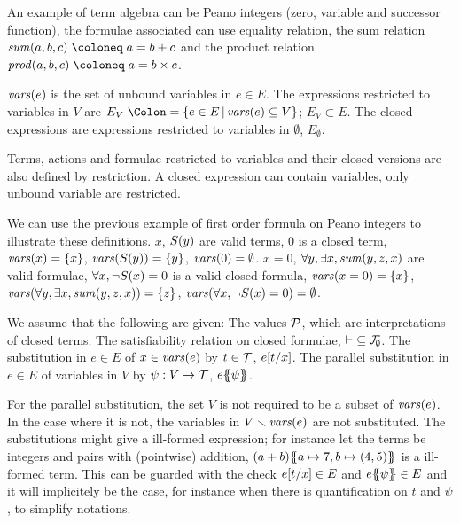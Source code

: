 \documentclass{article}
\begin{document}
An example of term algebra can be Peano integers (zero, variable and successor function), the formulae associated can use equality relation, the sum relation \(\mathit{sum}\mpar{a, b, c} \defobject a = b + c\) and the product relation \(\mathit{prod}\mpar{a, b, c} \defobject a = b \times c\).

\begin{defi}
 \(\mathit{vars}{\left(e\right)}\) is the set of unbound variables in \(e \in E\).
 The expressions restricted to variables in \(V\) are \(E_V \defnotation \mset{e \in E}{\fvars{e} \subseteq V}\); \(E_V \subset E\).
 The closed expressions are expressions restricted to variables in \(\emptyset\), \(E_\emptyset\).
\end{defi}
Terms, actions and formulae restricted to variables and their closed versions are also defined by restriction.
A closed expression can contain variables, only unbound variable are restricted.

We can use the previous example of first order formula on Peano integers to illustrate these definitions.
\(x\), \(S{\left(y\right)}\) are valid terms, \(0\) is a closed term, \(\mathit{vars}{\left(x\right)} = {\left\{x\right\}}\), \(\mathit{vars}{\left(S{\left(y\right)}\right)} = {\left\{y\right\}}\), \(\mathit{vars}{\left(0\right)} = \emptyset\).
\(x = 0\), \(\forall y, \exists x, \mathit{sum}{\left(y, z, x\right)}\) are valid formulae, \(\forall x, \neg S{\left(x\right)} = 0\) is a valid closed formula, \(\mathit{vars}{\left(x = 0\right)} = {\left\{x\right\}}\), \(\mathit{vars}{\left(\forall y, \exists x, \mathit{sum}{\left(y, z, x\right)}\right)} = {\left\{z\right\}}\), \(\mathit{vars}{\left(\forall x, \neg S{\left(x\right)} = 0\right)} = \emptyset\).

\begin{defi}
We assume that the following are given:
 The values \(\mathcal{P}\), which are interpretations of closed terms.
 The satisfiability relation on closed formulae, \({\vdash} \subseteq {\mathcal{F}}_{\!\!\emptyset}\).
 The substitution in \(e \in E\) of \(x \in \mathit{vars}{\left(e\right)}\) by \(t \in {\mathcal{T}}\), \(e{\left[t\middle/x\right]}\).
 The parallel substitution in \(e \in E\) of variables in \(V\) by \(\psi: V \to {\mathcal{T}}\), \(e{\left\{\!\!{\left\{\psi\right\}}\!\!\right\}}\).
\end{defi}
For the parallel substitution, the set \(V\) is not required to be a subset of \(\mathit{vars}{\left(e\right)}\).
In the case where it is not, the variables in \(V \smallsetminus \mathit{vars}{\left(e\right)}\) are not substituted.
The substitutions might give a ill-formed expression; for instance let the terms be integers and pairs with (pointwise) addition, \({\left(a + b\right)}{\left\{\!\!{\left\{a \mapsto 7, b \mapsto {\left(4, 5\right)}\right\}}\!\!\right\}}\) is a ill-formed term.
This can be guarded with the check \(e{\left[t\middle/x\right]} \in E\) and \(e{\left\{\!\!{\left\{\psi\right\}}\!\!\right\}} \in E\) and it will implicitely be the case, for instance when there is quantification on \(t\) and \(\psi\), to simplify notations.
\end{document}
